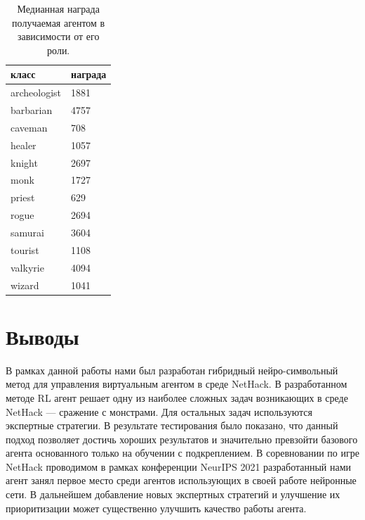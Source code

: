 \begin{table} [htbp]
    \centering
    \begin{threeparttable}
        \caption{Медианная награда получаемая агентом в зависимости от его роли.}\label{tab:raph_analize}
        \begin{tabular}{| p{8cm} || p{8cm} |}
            \hline
            \hline
            класс & награда \\
            \hline
            archeologist & 1881 \\
            barbarian & 4757 \\
            caveman & 708 \\
            healer & 1057 \\
            knight & 2697 \\
            monk & 1727 \\
            priest & 629 \\
            rogue & 2694 \\
            samurai & 3604 \\
            tourist & 1108 \\
            valkyrie & 4094 \\
            wizard & 1041 \\
            \hline
            \hline
        \end{tabular}
    \end{threeparttable}
\end{table}

\section{Выводы}

В рамках данной работы нами был разработан гибридный нейро-символьный метод для управления
виртуальным агентом в среде NetHack. В разработанном методе RL агент решает одну из наиболее сложных задач возникающих в среде NetHack --- сражение с монстрами. Для остальных задач используются экспертные стратегии. В результате тестирования было показано, что данный подход позволяет достичь хороших результатов и значительно превзойти базового агента основанного только на обучении с подкреплением. В соревновании по игре NetHack проводимом в рамках конференции NeurIPS 2021 разработанный нами агент занял первое место среди агентов использующих в своей работе нейронные сети. В дальнейшем добавление новых экспертных стратегий и улучшение их приоритизации может существенно улучшить качество работы агента. 


\clearpage
